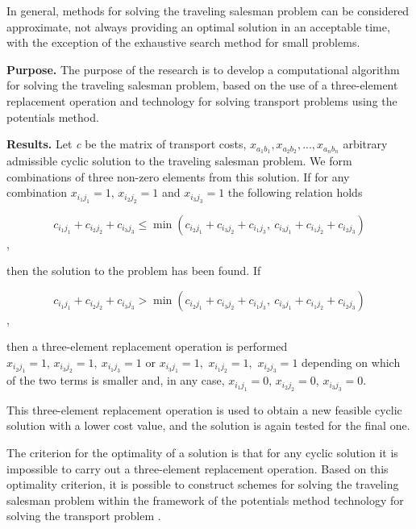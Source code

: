 \documentclass[12pt]{llncs}
\begin{document}
In general, methods for solving the traveling salesman problem can be considered approximate, not always providing an optimal solution in an acceptable time, with the exception of the exhaustive search method for small problems.

\textbf{Purpose.} The purpose of the research is to develop a computational algorithm for solving the traveling salesman problem,
 based on the use of a three-element replacement operation and technology for solving transport problems using the potentials method.

     \textbf{Results.} Let \textit{c} be the matrix of transport costs, $x_{a_{1} b_{1} } ,x_{a_{2} b_{2} } ,...,x_{a_{n} b_{n} }$
      arbitrary admissible cyclic solution
     to the traveling salesman problem. We form combinations of three non-zero elements from this solution.
     If for any combination $x_{i_{1} j_{1} }=1,\, x_{i_{2} j_{2} } =1$ and $x_{i_{3} j_{3} } =1$ the following relation holds

                               $$c_{i_{1} j_{1} } +c_{i_{2} j_{2} } +c_{i_{3} j_{3} }  \leq
                               \min(c_{i_{2} j_{1} }  +c_{i_{3} j_{2} } +c_{i_{1} j_{3} } ,  \ c_{i_{3} j_{1} } +c_{i_{1} j_{2} } +c_{i_{2} j_{3} } )$$,

then the solution to the problem has been found. If

                               $$c_{i_{1} j_{1} } +c_{i_{2} j_{2} } +c_{i_{3} j_{3} }  >
                               \min(c_{i_{2} j_{1} }  +c_{i_{3} j_{2} } +c_{i_{1} j_{3} } ,  \ c_{i_{3} j_{1} } +c_{i_{1} j_{2} } +c_{i_{2} j_{3} } )$$,

then a three-element replacement operation is performed $x_{i_{2} j_{1} } =1,\,
  x_{i_{3} j_{2} } =1,\ x_{i_{1} j_{3} } =1$ or
$x_{i_{3} j_{1} } =1,\, \, x_{i_{1} j_{2} } =1,\, \, x_{i_{2} j_{3} } =1$ depending on which of the two terms is smaller and, in any case,
$x_{i_{1} j_{1} } =0,\, x_{i_{2} j_{2} } =0,\, x_{i_{3} j_{3} } =0.$

     This three-element replacement operation is used to obtain a new feasible cyclic solution with a lower cost value, and the solution is again tested for the final one.

     The criterion for the optimality of a solution is that for any cyclic solution it is impossible to carry out a three-element replacement operation.
     Based on this optimality criterion, it is possible to construct schemes for solving the traveling salesman problem within the framework of the potentials
     method technology for solving the transport problem \cite{Terzi1}.
\end{document}
